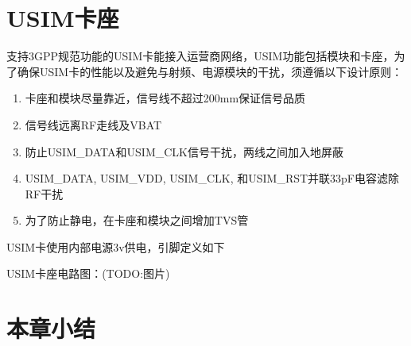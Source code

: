 \section{USIM卡座}
支持3GPP规范功能的USIM卡能接入运营商网络，USIM功能包括模块和卡座，为了确保USIM卡的性能以及避免与射频、电源模块的干扰，须遵循以下设计原则：

\begin{enumerate}
\item 卡座和模块尽量靠近，信号线不超过200mm保证信号品质
\item 信号线远离RF走线及VBAT
\item 防止USIM\_DATA和USIM\_CLK信号干扰，两线之间加入地屏蔽
\item USIM\_DATA, USIM\_VDD, USIM\_CLK, 和USIM\_RST并联33pF电容滤除RF干扰
\item 为了防止静电，在卡座和模块之间增加TVS管
\end{enumerate}

USIM卡使用内部电源3v供电，引脚定义如下

USIM卡座电路图：(TODO:图片)

\section{本章小结}
